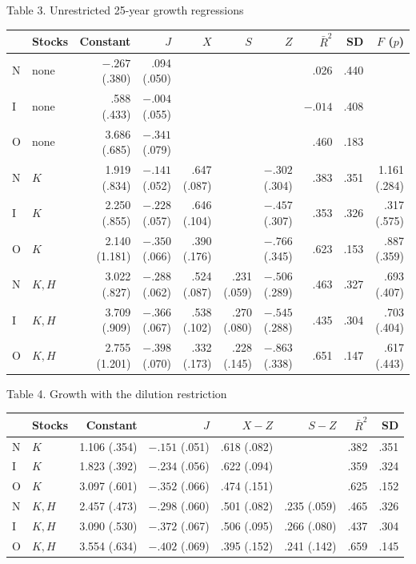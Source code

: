 \documentclass[11pt]{article}
\begin{document}
\begin{center}\scriptsize
Table 3. Unrestricted 25-year growth regressions\\[3pt]
\setlength{\tabcolsep}{3pt}
\begin{tabular}{llrrrrrrrr}\toprule
&Stocks&Constant&$J$&$X$&$S$&$Z$&$\bar R^2$&SD&$F$ ($p$)\\\midrule
N&none&$-.267$ (.380)&.094 (.050)&&&&.026&.440&\\
I&none&.588 (.433)&$-.004$ (.055)&&&&$-.014$&.408&\\
O&none&3.686 (.685)&$-.341$ (.079)&&&&.460&.183&\\
N&$K$&1.919 (.834)&$-.141$ (.052)&.647 (.087)&&$-.302$ (.304)&.383&.351&1.161 (.284)\\
I&$K$&2.250 (.855)&$-.228$ (.057)&.646 (.104)&&$-.457$ (.307)&.353&.326&.317 (.575)\\
O&$K$&2.140 (1.181)&$-.350$ (.066)&.390 (.176)&&$-.766$ (.345)&.623&.153&.887 (.359)\\
N&$K,H$&3.022 (.827)&$-.288$ (.062)&.524 (.087)&.231 (.059)&$-.506$ (.289)&.463&.327&.693 (.407)\\
I&$K,H$&3.709 (.909)&$-.366$ (.067)&.538 (.102)&.270 (.080)&$-.545$ (.288)&.435&.304&.703 (.404)\\
O&$K,H$&2.755 (1.201)&$-.398$ (.070)&.332 (.173)&.228 (.145)&$-.863$ (.338)&.651&.147&.617 (.443)\\\bottomrule
\end{tabular}

\medskip
Table 4. Growth with the dilution restriction\\[3pt]
\begin{tabular}{llrrrrrr}\toprule
&Stocks&Constant&$J$&$X-Z$&$S-Z$&$\bar R^2$&SD\\\midrule
N&$K$&1.106 (.354)&$-.151$ (.051)&.618 (.082)&&.382&.351\\
I&$K$&1.823 (.392)&$-.234$ (.056)&.622 (.094)&&.359&.324\\
O&$K$&3.097 (.601)&$-.352$ (.066)&.474 (.151)&&.625&.152\\
N&$K,H$&2.457 (.473)&$-.298$ (.060)&.501 (.082)&.235 (.059)&.465&.326\\
I&$K,H$&3.090 (.530)&$-.372$ (.067)&.506 (.095)&.266 (.080)&.437&.304\\
O&$K,H$&3.554 (.634)&$-.402$ (.069)&.395 (.152)&.241 (.142)&.659&.145\\\bottomrule
\end{tabular}


\end{center}
\end{document}
